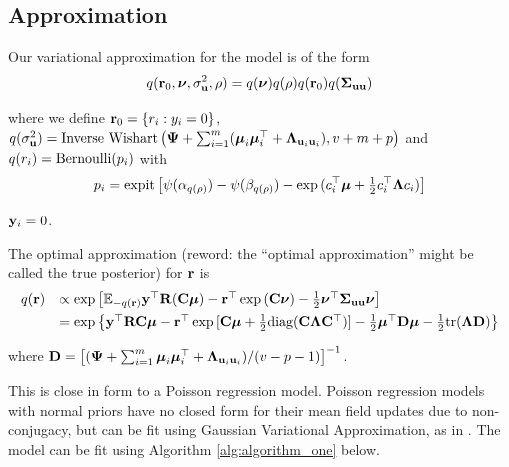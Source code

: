 \documentclass{amsart}[12pt]
\newcommand{\joc}[1]{{\color{red}#1}}
\begin{document}
\subsection{Approximation}

Our variational approximation for the model is of the form 
$$
q({\bf r}_0, {\boldsymbol \nu}, \sigma_{{\bf u}}^2, \rho) = q({\boldsymbol \nu})q(\rho) q({\bf r}_0)q({\boldsymbol \Sigma}_{{\bf u} {\bf u}})  \\
$$

\noindent 
where we define ${\bf r}_0 = \{ r_i : y_i = 0 \}$,
$q(\sigma_{{\bf u}}^2) = \mbox{Inverse Wishart}\left({\boldsymbol \Psi} + \sum_{i=1}^m ({\boldsymbol \mu}_i {\boldsymbol \mu}_i^\top + {\boldsymbol \Lambda}_{{\bf u}_i {\bf u}_i}), v + m + 
p\right)$ \mbox{and } $q(r_i) = \text{Bernoulli} (p_i)$ with
$$
p_i = \text{expit} \left[ \psi{(\alpha_{q(\rho)})} - \psi{(\beta_{q(\rho)})} - \exp{(c_i^\top{\boldsymbol\mu}+  \tfrac{1}{2} c_i^\top {\boldsymbol\Lambda}c_i)} \right]
$$

\noindent 
{} ${\bf y}_i = 0$.


\noindent The optimal approximation \joc{(reword: the ``optimal approximation'' might be called the true posterior)} for ${\bf r}$ is
$$
\begin{array}{rl}
	q({\bf r}) & \propto \exp \left [ {\mathbb E}_{-q({\bf r})}{\bf y}^\top{\bf R}({\bf C}{\boldsymbol \mu}) - {\bf r}^\top\exp{({\bf C}{\boldsymbol\nu})}-\tfrac{1}{2} {\boldsymbol \nu}^\top {\boldsymbol\Sigma}_{{\bf u} {\bf u}} {\boldsymbol \nu} \right ]                                                  \\ [1ex]
	       & = \exp{ \left\{ {\bf y}^\top{\bf R}{\bf C}{\boldsymbol\mu}- {\bf r}^\top \exp{[{\bf C}{\boldsymbol\mu}+  \tfrac{1}{2} \text{diag}({\bf C}{\boldsymbol\Lambda}{\bf C}^\top)]} -  \tfrac{1}{2} {\boldsymbol\mu}^\top {\bf D}{\boldsymbol\mu}-  \tfrac{1}{2} \text{tr}({\boldsymbol\Lambda}{\bf D}) \right\} } 
\end{array}
$$

\noindent where ${\bf D} = \left[ ({\boldsymbol \Psi} + \sum_{i=1}^m {\boldsymbol \mu}_i {\boldsymbol \mu}_i^\top + {\boldsymbol \Lambda}_{{\bf u}_i{\bf u}_i}) / (v - p - 1) \right]^{-1}$. 

This is close in form to a Poisson regression model. Poisson regression models with normal priors
have no closed form for their mean field updates due to non- conjugacy, but can be fit using Gaussian
Variational Approximation, as in \citep{ormerod09}. The model can be fit using Algorithm
\ref{alg:algorithm_one} below.
\end{document}
